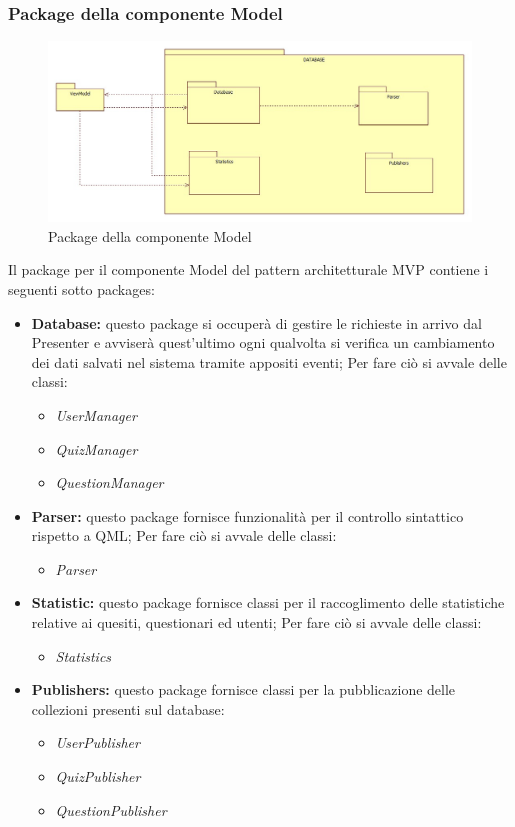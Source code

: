 \subsubsection{Package della componente Model}
	\begin{figure}[h!]
	\begin{center}
		\includegraphics[scale=0.65]{../images/ModelPackage.jpg}
		\caption{Package della componente Model}
	\end{center}
	\end{figure}
	Il package per il componente Model del pattern architetturale MVP contiene i seguenti sotto packages:
	\begin{itemize}
		\item\textbf{Database:} questo package si occuperà di gestire le richieste in arrivo dal Presenter e avviserà quest'ultimo ogni qualvolta si verifica un cambiamento dei dati salvati nel sistema tramite appositi eventi; Per fare ciò si avvale delle classi:
			\begin{itemize}
				\item\textit{UserManager}
				\item\textit{QuizManager}
				\item\textit{QuestionManager}
			\end{itemize}
		\item\textbf{Parser:} questo package fornisce funzionalità per il controllo sintattico rispetto a QML; Per fare ciò si avvale delle classi:
			\begin{itemize}
				\item\textit{Parser}
			\end{itemize}
		\item\textbf{Statistic:} questo package fornisce classi per il raccoglimento delle statistiche relative ai quesiti, questionari ed utenti; Per fare ciò si avvale delle classi:
			\begin{itemize}
				\item\textit{Statistics}
			\end{itemize}
			\item\textbf{Publishers:} questo package fornisce classi per la pubblicazione delle collezioni presenti sul database:
			\begin{itemize}
				\item\textit{UserPublisher}
				\item\textit{QuizPublisher}
				\item\textit{QuestionPublisher}
			\end{itemize}
		\end{itemize}
		\newpage